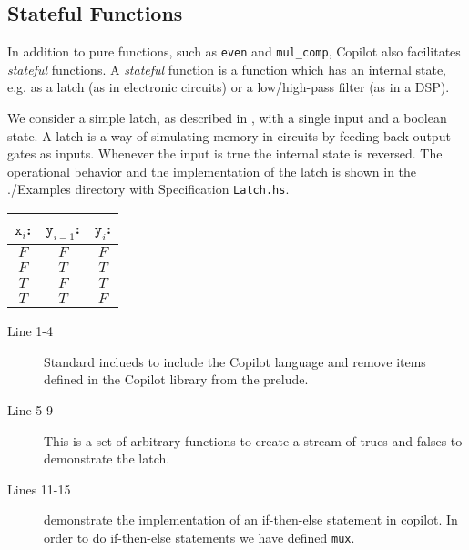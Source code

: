 \subsection{Stateful Functions} \label{sec:stateful}

In addition to pure functions, such as {\tt even} and {\tt mul\_comp}, Copilot
also facilitates \emph{stateful} functions.
%
A \emph{stateful} function is a function which has an internal state, e.g. as a
latch (as in electronic circuits) or a low/high-pass filter (as in a DSP).

\begin{example} We consider a simple latch, as described in \cite{Farhat2004},
with a single input and a boolean state.
%
A latch is a way of simulating memory in circuits by feeding back output gates
as inputs.
%
Whenever the input is true the internal state is reversed.
%
The operational behavior and the implementation of the latch is shown in the
./Examples directory with Specification {\tt Latch.hs}.

\begin{center}
\begin{minipage}{0.25\linewidth}
\begin{tabular}{c|c||c}
$\mathtt{x}_i$: & $\mathtt{y}_{i-1}$: & $\mathtt{y}_i$:\\
\hline
$F$ & $F$ & $F$ \\
\hline
$F$ & $T$ & $T$ \\
\hline
$T$ & $F$ & $T$ \\
\hline
$T$ & $T$ & $F$
\end{tabular}
\end{minipage}
\end{center}
\end{example}



\begin{description}
  \item[Line 1-4] Standard inclueds to include the Copilot language and remove 
  items defined in the Copilot library from the prelude.
  \item[Line 5-9] This is a set of arbitrary functions to create a stream of
  trues and falses to demonstrate the latch.
  \item[Lines 11-15] demonstrate the implementation of an if-then-else statement in copilot. In order to do if-then-else statements we have defined {\tt mux}.
\end{description}

